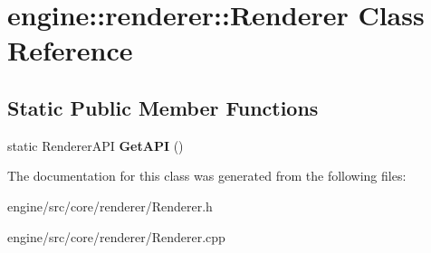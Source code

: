 \hypertarget{classengine_1_1renderer_1_1Renderer}{}\section{engine\+:\+:renderer\+:\+:Renderer Class Reference}
\label{classengine_1_1renderer_1_1Renderer}
\subsection*{Static Public Member Functions}
\begin{DoxyCompactItemize}
\item 
\mbox{\label{classengine_1_1renderer_1_1Renderer_aa2fc6d152284fd3c4e66b5ecbf8ab586}} 
static Renderer\+A\+PI {\bfseries Get\+A\+PI} ()
\end{DoxyCompactItemize}


The documentation for this class was generated from the following files\+:\begin{DoxyCompactItemize}
\item 
engine/src/core/renderer/Renderer.\+h\item 
engine/src/core/renderer/Renderer.\+cpp\end{DoxyCompactItemize}
